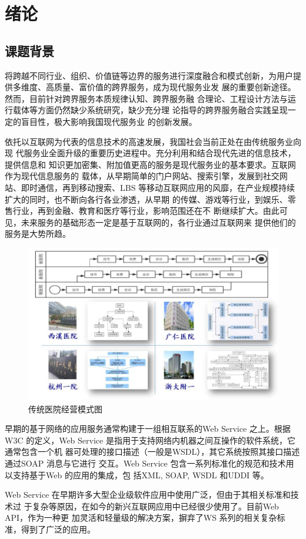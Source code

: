 \chapter{绪论}

\section{课题背景}

将跨越不同行业、组织、价值链等边界的服务进行深度融合和模式创新，为用户提供多维度、高质量、富价值的跨界服务，成为现代服务业发
展的重要创新途径。然而，目前针对跨界服务本质规律认知、跨界服务融   
合理论、工程设计方法与运行载体等方面仍然缺少系统研究，缺少充分理
论指导的跨界服务融合实践呈现一定的盲目性，极大影响我国现代服务业
的创新发展。

依托以互联网为代表的信息技术的高速发展，我国社会当前正处在由传统服务业向现
代服务业全面升级的重要历史进程中。充分利用和结合现代先进的信息技术，提供信息和
知识更加密集、附加值更高的服务是现代服务业的基本要求。互联网作为现代信息服务的
载体，从早期简单的门户网站、搜索引擎，发展到社交网站、即时通信，再到移动搜索、LBS
等移动互联网应用的风靡，在产业规模持续扩大的同时，也不断向各行各业渗透，从早期
的传媒、游戏等行业，到娱乐、零售行业，再到金融、教育和医疗等行业，影响范围还在不
断继续扩大\cite{王晓玲2015我国现代服务业借力}。由此可见，未来服务的基础形态一定是基于互联网的，各行业通过互联网来
提供他们的服务是大势所趋。

\begin{figure}[htbp]
    \centering
    \includegraphics[scale=1]{./images/hospitalRunningModel.jpg}
    \caption{传统医院经营模式图}
    \label{fig:example}
  \end{figure}

早期的基于网络的应用服务通常构建于一组相互联系的Web Service 之上。根据W3C
的定义，Web Service 是指用于支持网络内机器之间互操作的软件系统，它通常包含一个机
器可处理的接口描述（一般是WSDL），其它系统按照其接口描述通过SOAP 消息与它进行
交互\cite{verborgh2018web}。Web Service 包含一系列标准化的规范和技术用以支持基于Web 的应用的集成，包
括XML, SOAP, WSDL 和UDDI 等。

Web Service 在早期许多大型企业级软件应用中使用广泛，但由于其相关标准和技术过
于复杂等原因，在如今的新兴互联网应用中已经很少使用了。目前Web API，作为一种更
加灵活和轻量级的解决方案，摒弃了WS 系列的相关复杂标准，得到了广泛的应用\cite{zaveri2017smartapi}。



